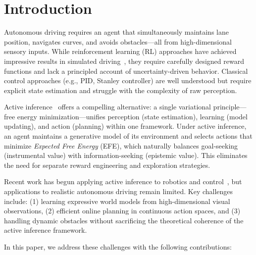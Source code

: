 \documentclass[conference]{IEEEtran}
\begin{document}
\section{Introduction}
\label{sec:intro}

Autonomous driving requires an agent that simultaneously maintains lane position, navigates curves, and avoids obstacles---all from high-dimensional sensory inputs. While reinforcement learning (RL) approaches have achieved impressive results in simulated driving~\cite{chen2020learning, toromanoff2020end}, they require carefully designed reward functions and lack a principled account of uncertainty-driven behavior. Classical control approaches (e.g., PID, Stanley controller) are well understood but require explicit state estimation and struggle with the complexity of raw perception.

Active inference~\cite{friston2010free, parr2022active} offers a compelling alternative: a single variational principle---free energy minimization---unifies perception (state estimation), learning (model updating), and action (planning) within one framework. Under active inference, an agent maintains a generative model of its environment and selects actions that minimize \emph{Expected Free Energy} (EFE), which naturally balances goal-seeking (instrumental value) with information-seeking (epistemic value). This eliminates the need for separate reward engineering and exploration strategies.

Recent work has begun applying active inference to robotics and control~\cite{catal2020learning, fountas2020deep, millidge2020deep, lanillos2021active}, but applications to realistic autonomous driving remain limited. Key challenges include: (1) learning expressive world models from high-dimensional visual observations, (2) efficient online planning in continuous action spaces, and (3) handling dynamic obstacles without sacrificing the theoretical coherence of the active inference framework.

In this paper, we address these challenges with the following contributions:
\end{document}
